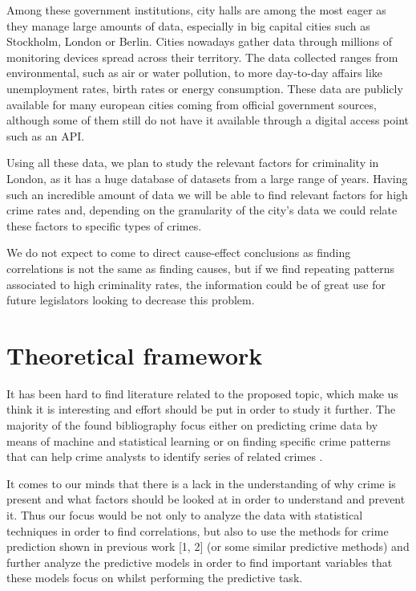 \documentclass[12pt, openany]{report}
\begin{document}
Among these government institutions, city halls are among the most eager as they manage large amounts of data, especially in big capital cities such as Stockholm, London or Berlin. Cities nowadays gather data  through millions of monitoring devices spread across their territory. The data collected ranges from environmental, such as air or water pollution, to more day-to-day affairs like unemployment rates, birth rates or energy consumption. These data are publicly available for many european cities coming from official government sources, although some of them still do not have it available through a digital access point such as an API.

Using all these data, we plan to study the relevant factors for criminality in London, as it has a huge database of datasets from a large range of years. Having such an incredible amount of data we will be able to find relevant factors for high crime rates and, depending on the granularity of the city's data we could relate these factors to specific types of crimes.

We do not expect to come to direct cause-effect conclusions as finding correlations is not the same as finding causes, but if we find repeating patterns associated to high criminality rates, the information could be of great use for future legislators looking to decrease this problem.

\section{Theoretical framework}

It has been hard to find literature related to the proposed topic, which make us think it is interesting and effort should be put in order to study it further. The majority of the found bibliography focus either on predicting crime data by means of machine \cite{mcclendon15} and statistical learning \cite{berk09} or on finding specific crime patterns that can help crime analysts to identify series of related crimes \cite{wang13}.

It comes to our minds that there is a lack in the understanding of why crime is present and what factors should be looked at in order to understand and prevent it. Thus our focus would be not only to analyze the data with statistical techniques in order to find correlations, but also to use the methods for crime prediction shown in previous work [1, 2] (or some similar predictive methods) and further analyze the predictive models in order to find important variables that these models focus on whilst performing the predictive task.
\end{document}
